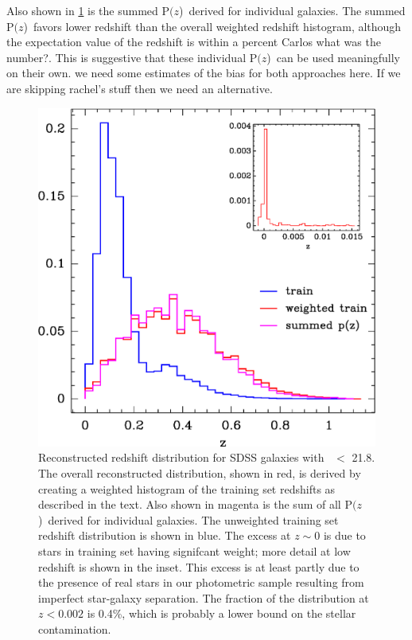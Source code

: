 \documentclass{emulateapj}
\newcommand{\rmax}{21.8}
\newcommand{\pofz}{P$(z$)}
\begin{document}
Also shown in \ref{fig:pofz} is the summed \pofz\ derived for individual
galaxies.  The summed \pofz\ favors lower redshift than the overall weighted
redshift histogram, although the expectation value of the redshift is within a
percent {\color{red} Carlos what was the number?}.  This is suggestive that
these individual \pofz\ can be used meaningfully on their own. {\color{red} 
we need some estimates of the bias for both approaches here.  If we are
skipping rachel's stuff then we need an alternative.}

\begin{figure}[t] \centering
    \includegraphics[scale=0.6]{figures/zweight-10-zhist-withorig-withsum-12.eps}

    \caption{Reconstructed redshift distribution for SDSS galaxies with \rmag\
    $ < $ \rmax.  The overall reconstructed distribution, shown in red, is
    derived by creating a weighted histogram of the training set redshifts as
    described in the text.  Also shown in magenta is the sum of all \pofz\
    derived for individual galaxies.  The unweighted training set redshift
    distribution is shown in blue.  The excess at $z \sim 0$ is due to stars in
    training set having signifcant weight; more detail at low redshift is shown
    in the inset.  This excess is at least partly due to the presence of real
    stars in our photometric sample resulting from imperfect star-galaxy
    separation.  The fraction of the distribution at $z < 0.002$ is 0.4\%,
    which is probably a lower bound on the stellar contamination.
    \label{fig:pofz}}

    \vspace{2em}
\end{figure}
\end{document}
